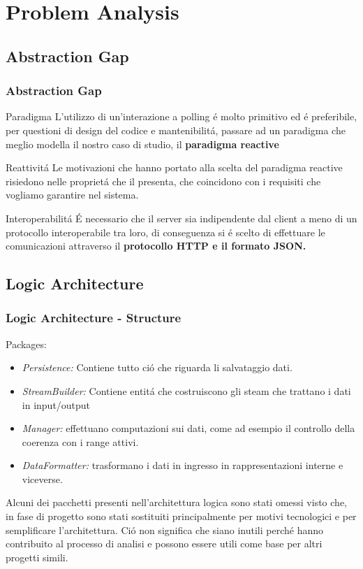 \documentclass{beamer}
\begin{document}
\section{Problem Analysis}

\subsection{Abstraction Gap}

\begin{frame}
  \frametitle{Abstraction Gap}
  \begin{block}{Paradigma}
    L'utilizzo di un'interazione a polling \'e molto primitivo ed \'e preferibile, per questioni di design del codice e mantenibilit\'a, passare ad un paradigma che meglio modella il nostro caso di studio, il \textbf{paradigma reactive}
  \end{block}
  \begin{block}{Reattivit\'a}
    Le motivazioni che hanno portato alla scelta del paradigma reactive risiedono nelle propriet\'a che il \cite{reactiveManifesto} presenta, che coincidono con i requisiti che vogliamo garantire nel sistema.
  \end{block}
  \begin{block}{Interoperabilit\'a}
    \'E necessario che il server sia indipendente dal client a meno di un protocollo interoperabile tra loro, di conseguenza si \'e scelto di effettuare le comunicazioni attraverso il \textbf{protocollo HTTP e il formato JSON.}
  \end{block}
\end{frame}

\subsection{Logic Architecture}

\begin{frame}
  \frametitle{Logic Architecture - Structure}
  Packages:
  \begin{itemize}
    \item \textit{Persistence:} Contiene tutto ci\'o che riguarda li salvataggio dati.
    \item \textit{StreamBuilder:} Contiene entit\'a che costruiscono gli steam che trattano i dati in input/output
    \item \textit{Manager:} effettuano computazioni sui dati, come ad esempio il controllo della coerenza con i range attivi.
    \item \textit{DataFormatter:} trasformano i dati in ingresso in rappresentazioni interne e viceverse.
  \end{itemize}
  Alcuni dei pacchetti presenti nell'architettura logica sono stati omessi visto che, in fase di progetto sono stati sostituiti principalmente per motivi tecnologici e per semplificare l'architettura. Ci\'o non significa che siano inutili perch\'e hanno contribuito al processo di analisi e possono essere utili come base per altri progetti simili.
\end{frame}
\end{document}
